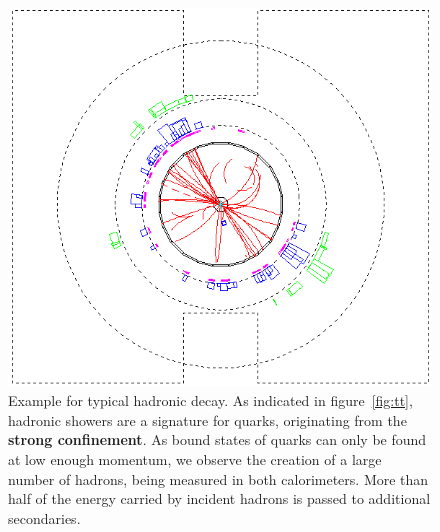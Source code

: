 \begin{figure}[htpb]
    \centering
    \includegraphics[width=0.8\linewidth]{figures/qq_02.png}
    \caption{Example for typical hadronic decay. As indicated in figure~\ref{fig:tt}, hadronic showers are 
   a signature for quarks, originating from the \textbf{strong confinement}. 
   As bound states of quarks can only be found at low enough
   momentum, we observe the creation of a large number of hadrons, being
   measured in both calorimeters. More than half of
   the energy carried by incident hadrons is passed to additional secondaries. }
\label{fig:qq}
\end{figure}

\clearpage
